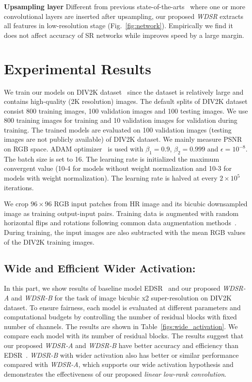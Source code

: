 \documentclass{article}
\begin{document}
\textbf{Upsampling layer} Different from previous state-of-the-arts~\cite{lim2017enhanced, 2018arXiv180208797Z} where one or more convolutional layers are inserted after upsampling, our proposed \textit{WDSR} extracts all features in low-resolution stage (Fig.~\ref{fig:network}). Empirically we find it does not affect accuracy of SR networks while improves speed by a large margin. 
\section{Experimental Results}

We train our models on DIV2K dataset~\cite{timofte2017ntire} since the dataset is relatively large and contains high-quality (2K resolution) images. The default splits of DIV2K dataset consist 800 training images, 100 validation images and 100 testing images. We use 800 training images for training and 10 validation images for validation during training. The trained models are evaluated on 100 validation images (testing images are not publicly available) of DIV2K dataset. We mainly measure PSNR on RGB space. ADAM optimizer~\cite{kingma2014adam} is used with \(\beta_1 = 0.9\), \(\beta_2 = 0.999\) and \(\epsilon = 10^{-8}\). The batch size is set to 16. The learning rate is initialized the maximum convergent value (10-4 for models without weight normalization and 10-3 for models with weight normalization). The learning rate is halved at every \(2 \times 10^5\) iterations.

We crop \(96 \times 96\) RGB input patches from HR image and its bicubic downsampled image as training output-input pairs. Training data is augmented with random horizontal flips and rotations following common data augmentation methods~\cite{fan2017balanced, lim2017enhanced}. During training, the input images are also subtracted with the mean RGB values of the DIV2K training images.

\subsection{Wide and Efficient Wider Activation:}

In this part, we show results of baseline model EDSR~\cite{lim2017enhanced} and our proposed \textit{WDSR-A} and \textit{WDSR-B} for the task of image bicubic x2 super-resolution on DIV2K dataset. To ensure fairness, each model is evaluated at different parameters and computational budgets by controlling the number of residual blocks with fixed number of channels. The results are shown in Table~\ref{figs:wide_activation}. We compare each model with its number of residual blocks. The results suggest that our proposed \textit{WDSR-A} and \textit{WDSR-B} have better accuracy and efficiency than EDSR~\cite{lim2017enhanced}. \textit{WDSR-B} with wider activation also has better or similar performance compared with \textit{WDSR-A}, which supports our wide activation hypothesis and demonstrates the effectiveness of our proposed \textit{linear low-rank convolution}.
\end{document}
